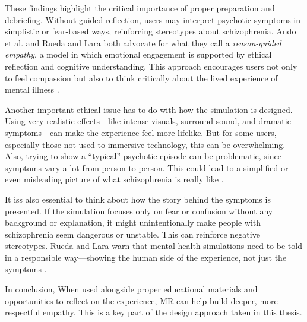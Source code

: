 These findings highlight the critical importance of proper preparation and debriefing. Without guided reflection, users may interpret psychotic symptoms in simplistic or fear-based ways, reinforcing stereotypes about schizophrenia. Ando et al. and Rueda and Lara both advocate for what they call a \textit{reason-guided empathy}, a model in which emotional engagement is supported by ethical reflection and cognitive understanding. This approach encourages users not only to feel compassion but also to think critically about the lived experience of mental illness \cite{Ando2011, Rueda2020}.

Another important ethical issue has to do with how the simulation is designed. Using very realistic effects—like intense visuals, surround sound, and dramatic symptoms—can make the experience feel more lifelike. But for some users, especially those not used to immersive technology, this can be overwhelming. Also, trying to show a “typical” psychotic episode can be problematic, since symptoms vary a lot from person to person. This could lead to a simplified or even misleading picture of what schizophrenia is really like \cite{Zare-Bidaki2022}.

It iss also essential to think about how the story behind the symptoms is presented. If the simulation focuses only on fear or confusion without any background or explanation, it might unintentionally make people with schizophrenia seem dangerous or unstable. This can reinforce negative stereotypes. Rueda and Lara warn that mental health simulations need to be told in a responsible way—showing the human side of the experience, not just the symptoms \cite{Rueda2020}.

In conclusion, When used alongside proper educational materials and opportunities to reflect on the experience, MR can help build deeper, more respectful empathy. This is a key part of the design approach taken in this thesis.


